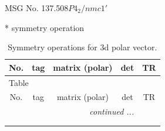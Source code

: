 \documentclass[fleqn,8pt]{jsarticle}
\begin{document}
\setcounter{MaxMatrixCols}{32}

\renewcommand{\tablename}{Table~}
\renewcommand{\figurename}{Figure~}
\begin{center}
\LARGE
MSG No. 137.508\quad$P4_{2}/nmc1'$
\end{center}
* symmetry operation
\renewcommand{\arraystretch}{1.3}
\begin{longtable}{ccccc}
\caption{Symmetry operations for 3d polar vector.}
 \\
 \hline \hline
No. & tag & matrix (polar) & det & TR \\ \hline \endfirsthead

\multicolumn{4}{l}{\tablename\ \thetable{}} \\
 \hline \hline
No. & tag & matrix (polar) & det & TR \\ \hline \endhead

 \hline \hline
\multicolumn{4}{r}{\footnotesize\it continued ...} \\ \endfoot

 \hline \hline
\multicolumn{4}{r}{} \\ \endlastfoot


\end{longtable}
\end{document}
